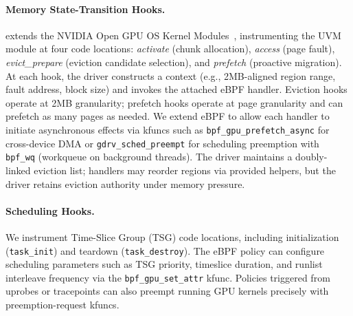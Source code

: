 \paragraph{Memory State-Transition Hooks.}
\sys extends the NVIDIA Open GPU OS Kernel Modules~\cite{nvidia-open-gpu}, instrumenting the UVM module at four code locations: \emph{activate} (chunk allocation), \emph{access} (page fault), \emph{evict\_prepare} (eviction candidate selection), and \emph{prefetch} (proactive migration).
At each hook, the driver constructs a context (e.g., 2MB-aligned region range, fault address, block size) and invokes the attached eBPF handler.
Eviction hooks operate at 2MB granularity; prefetch hooks operate at page granularity and can prefetch as many pages as needed.
We extend eBPF to allow each handler to initiate asynchronous effects via kfuncs such as \texttt{bpf\_gpu\_\allowbreak{}prefetch\_async} for cross-device DMA or \texttt{gdrv\_sched\_\allowbreak{}preempt} for scheduling preemption with \texttt{bpf\_wq} (workqueue on background threads).
The driver maintains a doubly-linked eviction list; handlers may reorder regions via provided helpers, but the driver retains eviction authority under memory pressure.

\paragraph{Scheduling Hooks.}
We instrument Time-Slice Group (TSG) code locations, including initialization (\texttt{task\_init}) and teardown (\texttt{task\_destroy}).
The eBPF policy can configure scheduling parameters such as TSG priority, timeslice duration, and runlist interleave frequency via the \texttt{bpf\_gpu\_set\_attr} kfunc.
Policies triggered from uprobes or tracepoints can also preempt running GPU kernels precisely with preemption-request kfuncs.

